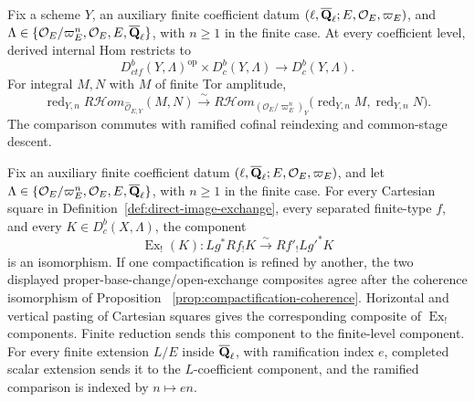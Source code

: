 \begin{proposition}
\label{prop:internal-hom-constructibility}


Fix a scheme \(Y\), an auxiliary finite coefficient datum
\((\ell,\overline{\mathbf Q}_\ell;E,\mathcal O_E,\varpi_E)\), and
\(\Lambda\in\{\mathcal O_E/\varpi_E^n,\mathcal O_E,E,\overline{\mathbf Q}_\ell\}\), with
\(n\geq1\) in the finite case.  At every coefficient level, derived
internal Hom restricts to
\[
 D^b_{ctf}(Y,\Lambda)^{\mathrm{op}}\times D^b_c(Y,\Lambda)
 \longrightarrow D^b_c(Y,\Lambda).
\]
For integral \(M,N\) with \(M\) of finite Tor amplitude,
\[
 \operatorname{red}_{Y,n}R\mathcal Hom_{\widehat{\mathcal O}_{E,Y}}(M,N)
 \xrightarrow{\sim}
 R\mathcal Hom_{(\mathcal O_E/\varpi_E^n)_Y}
 \bigl(\operatorname{red}_{Y,n}M,\operatorname{red}_{Y,n}N\bigr).
\]
The comparison commutes with ramified cofinal reindexing and common-stage
descent.
\end{proposition}


\begin{proposition}
\label{prop:compact-support-base-change}


Fix an auxiliary finite coefficient datum
\((\ell,\overline{\mathbf Q}_\ell;E,\mathcal O_E,\varpi_E)\), and let
\(\Lambda\in\{\mathcal O_E/\varpi_E^n,\mathcal O_E,E,\overline{\mathbf Q}_\ell\}\), with
\(n\geq1\) in the finite case.  For every Cartesian square in
Definition~\ref{def:direct-image-exchange},
every separated finite-type \(f\), and every
\(K\in D^b_c(X,\Lambda)\), the component
\[
 \operatorname{Ex}_!(K):Lg^*Rf_!K
 \xrightarrow{\sim}Rf'_!Lg'^*K
\]
is an isomorphism.  If one compactification is refined by another, the two
displayed proper-base-change/open-exchange composites agree after the
coherence isomorphism of Proposition
~\ref{prop:compactification-coherence}.  Horizontal and vertical pasting of
Cartesian squares gives the corresponding composite of \(\operatorname{Ex}_!\)
components.  Finite reduction sends this component to the finite-level
component.  For every finite extension \(L/E\) inside \(\overline{\mathbf Q}_\ell\), with
ramification index \(e\), completed scalar extension sends it to the
\(L\)-coefficient component, and the ramified comparison is indexed by
\(n\mapsto en\).
\end{proposition}

